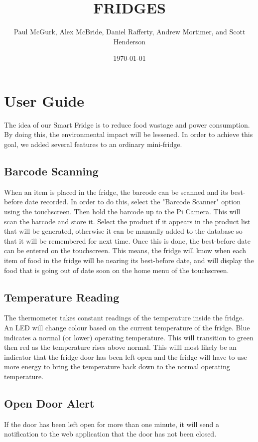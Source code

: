 \documentclass[10pt]{article}
\title{FRIDGES}
\author{Paul McGurk, Alex McBride, Daniel Rafferty, Andrew Mortimer, and Scott Henderson}
\date{\today}
\begin{document}
\begin{titlepage}
\maketitle
\end{titlepage}

\linespread{1.15} %
\renewcommand{\arraystretch}{1.2} %

\tableofcontents

\newpage
\section{User Guide}
The idea of our Smart Fridge is to reduce food wastage and power consumption. By doing this, the environmental impact will be lessened. In order to achieve this goal, we added several features to an ordinary mini-fridge.
\subsection{Barcode Scanning}
When an item is placed in the fridge, the barcode can be scanned and its best-before date recorded. In order to do this, select the "Barcode Scanner" option using the touchscreen. Then hold the barcode up to the Pi Camera. This will scan the barcode and store it. Select the product if it appears in the product list that will be generated, otherwise it can be manually added to the database so that it will be remembered  for next time. Once this is done, the best-before date can be entered on the touchscreen. This means, the fridge will know when each item of food in the fridge will be nearing its best-before date, and will display the food that is going out of date soon on the home menu of the touchscreen.
\subsection{Temperature Reading}
The thermometer takes constant readings of the temperature inside the fridge. An LED will change colour based on the current temperature of the fridge. Blue indicates a normal (or lower) operating temperature. This will transition to green then red as the temperature rises above normal. This willl most likely be an indicator that the fridge door has been left open and the fridge will have to use more energy to bring the temperature back down to the normal operating temperature.
\subsection{Open Door Alert}
If the door has been left open for more than one minute, it will send a notification to the web application that the door has not been closed.
\end{document}
